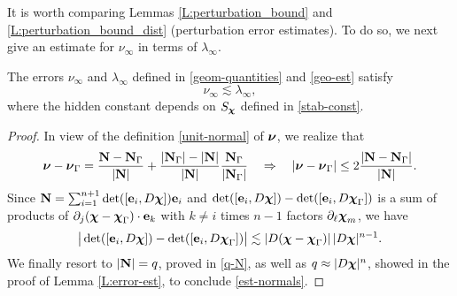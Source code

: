 It is worth comparing Lemmas \ref{L:perturbation_bound} and
\ref{L:perturbation_bound_dist} (perturbation error estimates). To do so, we next give an estimate for
$\nu_\infty$ in terms of $\lambda_\infty$.

\begin{lemma}\label{L:est-normals}
The errors $\nu_\infty$ and $\lambda_\infty$ defined in \eqref{geom-quantities}
and \eqref{geo-est} satisfy
%
\begin{equation}\label{est-normals}
\nu_\infty \lesssim \lambda_\infty,
\end{equation}  
where the hidden constant depends on $S_{\boldsymbol \chi}$ defined in \eqref{stab-const}.
\end{lemma}
%
\begin{proof}
In view of the definition \eqref{unit-normal} of ${\boldsymbol \nu}$, we realize that
%
\[
{\boldsymbol \nu}-{\boldsymbol \nu}_\Gamma = \frac{{\bf N}-{\bf N}_\Gamma}{|{\bf N}|}
+ \frac{|{\bf N}_\Gamma|-|{\bf N}|}{|{\bf N}|} \frac{{\bf N}_\Gamma}{|{\bf N}_\Gamma|}
\quad\Rightarrow\quad
|{\boldsymbol \nu}-{\boldsymbol \nu}_\Gamma| \le 2 \frac{|{\bf N}-{\bf N}_\Gamma|}{|{\bf N}|}.
\]
%
Since ${\bf N} = \sum_{i=1}^{n+1} \det([{\bf e}_i,D{\boldsymbol \chi}]) {\bf e}_i$ and
$\det([{\bf e}_i,D{\boldsymbol \chi}]) - \det([{\bf e}_i,D{\boldsymbol \chi}_\Gamma])$ is a sum of products of
$\partial_j ({\boldsymbol \chi}-{\boldsymbol \chi}_\Gamma)\cdot{\bf e}_k$ with $k\ne i$ times $n-1$ factors
$\partial_\ell{\boldsymbol \chi}_m$, we have
%
\[
\big| \det([{\bf e}_i,D{\boldsymbol \chi}]) - \det([{\bf e}_i,D{\boldsymbol \chi}_\Gamma])  \big|
\lesssim |D({\boldsymbol \chi}-{\boldsymbol \chi}_\Gamma)| \, |D{\boldsymbol \chi}|^{n-1}.
\]
%
We finally resort to $|{\bf N}|=q$, proved in \eqref{q-N}, as well as $q\approx|D{\boldsymbol \chi}|^n$,
showed in the proof of Lemma \ref{L:error-est}, to conclude \eqref{est-normals}.
\end{proof}

